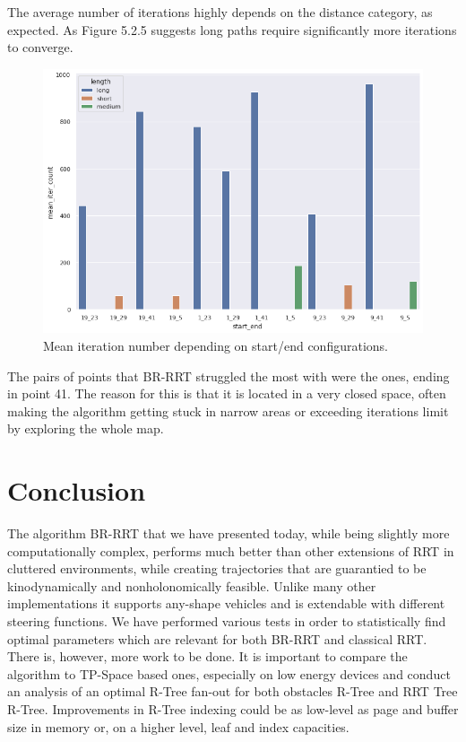 \documentclass[a4paper,12pt]{article}
\DeclareRobustCommand{\[}{\begin{equation}}
\DeclareRobustCommand{\]}{\end{equation}}
\numberwithin{equation}{section}
\numberwithin{algorithm}{section}
\begin{document}
The average number of iterations highly depends on the distance category, as expected. As Figure 5.2.5 suggests long paths require significantly more iterations to converge.
\begin{figure}[H]
\begin{center}
\includegraphics[scale=0.5]{images/se_iter_count.png}
\captionsetup{width=0.6\textwidth}
\caption{Mean iteration number depending on start/end configurations.}
\end{center}
\end{figure}
The pairs of points that BR-RRT struggled the most with were the ones, ending in point 41. The reason for this is that it is located in a very closed space, often making the algorithm getting stuck in narrow areas or exceeding iterations limit by exploring the whole map.

\section{Conclusion}

The algorithm BR-RRT that we have presented today, while being slightly more computationally complex, performs much better than other extensions of RRT in cluttered
environments, while creating trajectories that are guarantied to be kinodynamically and nonholonomically feasible. Unlike many other implementations it supports any-shape vehicles and is extendable with different steering functions. We have performed various tests in order to statistically find optimal parameters which
are relevant for both BR-RRT and classical RRT. There is, however, more work to be done. It is important to compare the algorithm to TP-Space based ones,
especially on low energy devices and conduct an analysis of an optimal R-Tree fan-out for both obstacles R-Tree and RRT Tree R-Tree. Improvements in R-Tree indexing
could be as low-level as page and buffer size in memory or, on a higher level, leaf and index capacities. 
\end{document}
